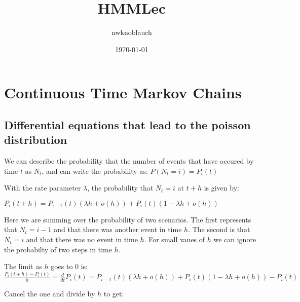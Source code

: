\documentclass[12pt]{report}
\begin{document}

\maketitle

\vspace*{.1in}




\providecommand{\alert}[1]{\textbf{#1}}

\title{HMMLec}
\author{nwknoblauch}
\date{\today}


\section{Continuous Time Markov Chains}
\label{sec-1}
\subsection{Differential equations that lead to the poisson distribution}
\label{sec-1-1}

We can describe the probability that the number of events that have occured by time $t$ as $N_t$, and can write the probability as:
$P(N_t=i)=P_i(t)$

With the rate parameter $\lambda$, the probability that $N_t=i$ at $t+h$ is given by:
 
$P_i(t+h)=P_{\mathrm{i-1}}(t)(\lambda h + o(h)) + P_i(t)(1-\lambda h + o(h)) $

Here we are summing over the probability of two scenarios.  The first represents that $N_t=i-1$ and that there was another event in time $h$.  The second is that $N_t=i$ and that there was no event in time $h$. For small vaues of $h$ we can ignore the probabilty of two steps in time $h$.


The limit as $h$ goes to 0 is: $\frac{P_i(t+h)-P_i(t)}{h}=\frac{d}{dt}P_i(t)=P_{i-1}(t)(\lambda h + o(h)) + P_i(t)(1-\lambda h + o(h))-P_i(t)$

Cancel the one and divide by $h$ to get:
\end{document}

